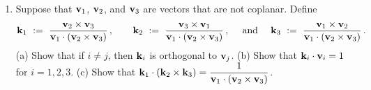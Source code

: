 \documentclass[12pt]{article}
\newcommand{\bfv}{{\bf v}}    %
\newcommand{\bfk}{{\bf k}}    %
\begin{document}
\begin{enumerate}
\item Suppose that $\bfv_1$, $\bfv_2$, and $\bfv_3$ are vectors that are not coplanar.
  Define\vspace{-5pt}
   \[
   \bfk_1\ :=\ \frac{\bfv_2\times\bfv_3}{\bfv_1\cdot(\bfv_2\times\bfv_3)}\,, \qquad
   \bfk_2\ :=\ \frac{\bfv_3\times\bfv_1}{\bfv_1\cdot(\bfv_2\times\bfv_3)}\,, \quad \mbox{ and }\quad
   \bfk_3\ :=\ \frac{\bfv_1\times\bfv_2}{\bfv_1\cdot(\bfv_2\times\bfv_3)}\,.    \vspace{-5pt}
   \]
   (a) Show that if $i\neq j$, then $\bfk_i$ is orthogonal to $\bfv_j$.\newline
   (b) Show that $\bfk_i\cdot\bfv_i=1$ for $i=1,2,3$. \newline
   (c) Show that ${\displaystyle \bfk_1\cdot(\bfk_2\times\bfk_3)=\frac{1}{\bfv_1\cdot(\bfv_2\times\bfv_3)}}$.
   




\end{enumerate}  
\newpage
\end{document}
